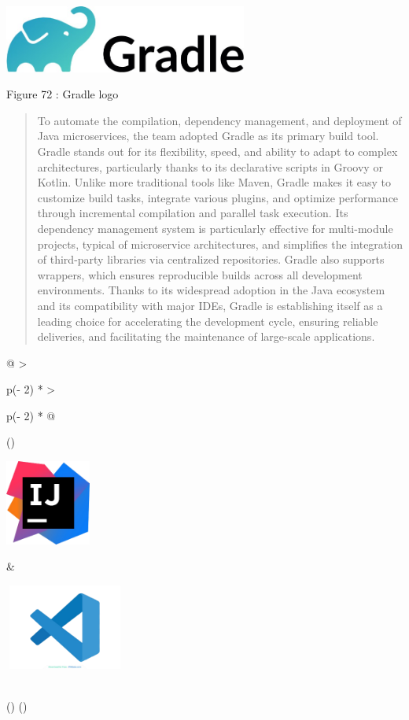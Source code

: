 \documentclass[12pt,a4paper]{report}
\begin{document}
\includegraphics[width=3.1488in,height=0.87083in]{vertopal_d1b0b2209edd4c6aa8254f57daa0953b/media/image91.jpeg}

\protect\hypertarget{_Toc201954548}{}{}Figure 72 : Gradle logo

\begin{quote}
To automate the compilation, dependency management, and deployment of
Java microservices, the team adopted Gradle as its primary build tool.
Gradle stands out for its flexibility, speed, and ability to adapt to
complex architectures, particularly thanks to its declarative scripts in
Groovy or Kotlin. Unlike more traditional tools like Maven, Gradle makes
it easy to customize build tasks, integrate various plugins, and
optimize performance through incremental compilation and parallel task
execution. Its dependency management system is particularly effective
for multi-module projects, typical of microservice architectures, and
simplifies the integration of third-party libraries via centralized
repositories. Gradle also supports wrappers, which ensures reproducible
builds across all development environments. Thanks to its widespread
adoption in the Java ecosystem and its compatibility with major IDEs,
Gradle is establishing itself as a leading choice for accelerating the
development cycle, ensuring reliable deliveries, and facilitating the
maintenance of large-scale applications.
\end{quote}

\begin{longtable}[]{@{}
  >{\raggedright\arraybackslash}p{(\columnwidth - 2\tabcolsep) * }
  >{\raggedright\arraybackslash}p{(\columnwidth - 2\tabcolsep) * }@{}}
\toprule()
\begin{minipage}[b]{\linewidth}\raggedright
\includegraphics[width=1.10236in,height=1.10236in]{vertopal_d1b0b2209edd4c6aa8254f57daa0953b/media/image92.png}
\end{minipage} & \begin{minipage}[b]{\linewidth}\raggedright
\includegraphics[width=1.55685in,height=1.10236in]{vertopal_d1b0b2209edd4c6aa8254f57daa0953b/media/image93.png}
\end{minipage} \\
\midrule()
\endhead
\bottomrule()
\end{longtable}
\end{document}
